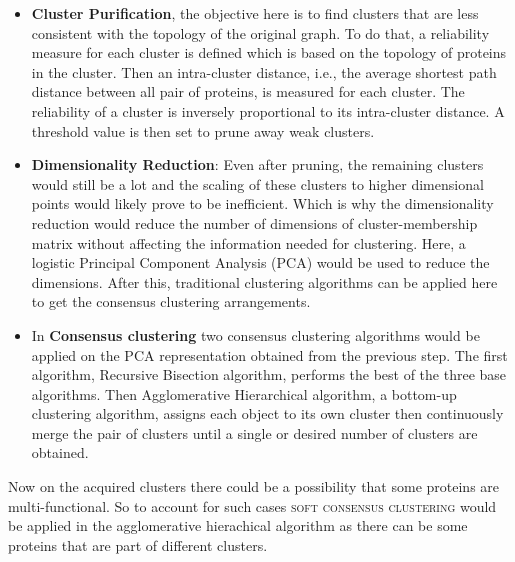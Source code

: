 \begin{itemize}
    \item \textbf{Cluster Purification}, the objective here is to find clusters that are less consistent with the topology of the original graph. To do that, a reliability measure for each cluster is defined which is based on the topology of proteins in the cluster. Then an intra-cluster distance, i.e., the average shortest path distance between all pair of proteins, is measured for each cluster. The reliability of a cluster is inversely proportional to its intra-cluster distance. A threshold value is then set to prune away weak clusters.
    \item \textbf{Dimensionality Reduction}: Even after pruning, the remaining clusters would still be a lot and the scaling of these clusters to higher dimensional points would likely prove to be inefficient. Which is why the dimensionality reduction would reduce the number of dimensions of cluster-membership matrix without affecting the information needed for clustering. Here, a logistic Principal Component Analysis (PCA) would be used to reduce the dimensions. After this, traditional clustering algorithms can be applied here to get the consensus clustering arrangements. 
    \item In \textbf{Consensus clustering} two consensus clustering algorithms would be applied on the PCA representation obtained from the previous step. The first algorithm, Recursive Bisection algorithm, performs the best of the three base algorithms. Then Agglomerative Hierarchical algorithm, a bottom-up clustering algorithm, assigns each object to its own cluster then continuously merge the pair of clusters until a single or desired number of clusters are obtained.  
\end{itemize}

Now on the acquired clusters there could be a possibility that some proteins are multi-functional. So to account for such cases \textsc{soft consensus clustering} would be applied in the agglomerative hierachical algorithm as there can be some proteins that are part of different clusters.